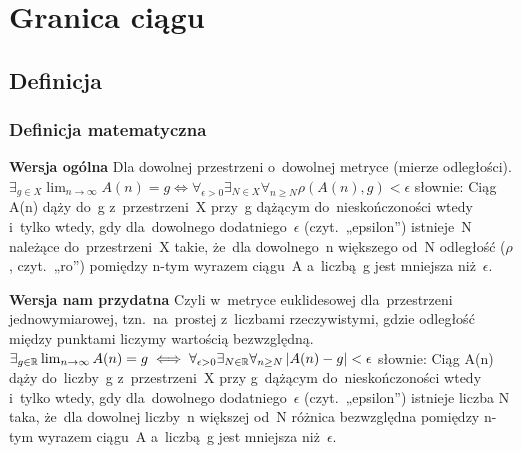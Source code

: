\section{Granica ciągu}

\subsection{Definicja}

\subsubsection{Definicja matematyczna}

\noindent
\textbf{Wersja ogólna}
\newline
Dla dowolnej przestrzeni o~dowolnej metryce (mierze odległości).
\newline
\newline
$ \exists_{g \in X} \lim_{n \to \infty} A(n) = g \iff \forall_{\epsilon>0} \exists_{N \in X} \forall_{n \geq N}  \rho(A(n), g) < \epsilon $
\newline
\newline
słownie: Ciąg A(n) dąży do~g z~przestrzeni~X przy~g dążącym do~nieskończoności wtedy i~tylko wtedy, gdy dla~dowolnego dodatniego~$\epsilon$ (czyt.~„epsilon”) istnieje~N należące do~przestrzeni~X takie, że~dla dowolnego~n większego od~N odległość ($\rho$, czyt.~„ro”) pomiędzy n-tym wyrazem ciągu~A a~liczbą~g jest mniejsza niż~$\epsilon$.
\newline

\noindent
\textbf{Wersja nam przydatna}
\newline
Czyli w~metryce euklidesowej dla~przestrzeni jednowymiarowej, tzn.~na~prostej z~liczbami rzeczywistymi, gdzie odległość między punktami liczymy wartością bezwzględną. 
\newline
\newline
$ \exists_{g \in \mathbb{R}} \lim_{n \to \infty} A(n) = g \iff \forall_{\epsilon>0} \exists_{N \in \mathbb{R}} \forall_{n \geq N} \left|A(n) - g\right| < \epsilon $
\newline
\newline
słownie: Ciąg A(n) dąży do~liczby~g z~przestrzeni~X przy g~dążącym do~nieskończoności wtedy i~tylko wtedy, gdy dla~dowolnego dodatniego~$\epsilon$ (czyt.~„epsilon”) istnieje liczba N taka, że~dla dowolnej liczby~n większej od~N różnica bezwzględna pomiędzy n-tym wyrazem ciągu~A a~liczbą~g jest mniejsza niż~$\epsilon$.
\newline

